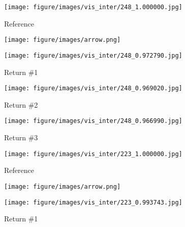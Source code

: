 \captionsetup[subfigure]{labelformat=empty}
\begin{figure*}[t]
\centering
  \begin{subfigure}[b]{.095\linewidth}
    \centering
    \caption{Reference}
    \vspace{-2mm}
    \texttt{[image: figure/images/vis\_inter/248\_1.000000.jpg]}
  \end{subfigure}\hspace{-1mm}
  \begin{subfigure}[b]{0.095\linewidth}
    \centering
    \texttt{[image: figure/images/arrow.png]}
  \end{subfigure} \hspace{-2mm} 
  \begin{subfigure}[b]{.095\linewidth}
    \centering
    \caption{Return \#1}
    \vspace{-2mm}
    \texttt{[image: figure/images/vis\_inter/248\_0.972790.jpg]}
  \end{subfigure}  
   \begin{subfigure}[b]{.095\linewidth}
    \centering
    \caption{Return \#2}
    \vspace{-2mm}
    \texttt{[image: figure/images/vis\_inter/248\_0.969020.jpg]}
  \end{subfigure} 
  \begin{subfigure}[b]{.095\linewidth}
    \centering
    \caption{Return \#3}
    \vspace{-2mm}
     \texttt{[image: figure/images/vis\_inter/248\_0.966990.jpg]}
  \end{subfigure} \hspace{5mm}
   \begin{subfigure}[b]{.095\linewidth}
    \centering
    \caption{Reference}
    \vspace{-2mm}
    \texttt{[image: figure/images/vis\_inter/223\_1.000000.jpg]}
  \end{subfigure}\hspace{-1mm} 
  \begin{subfigure}[b]{0.095\linewidth}
    \centering
    \texttt{[image: figure/images/arrow.png]}
  \end{subfigure}  \hspace{-2mm} 
\begin{subfigure}[b]{.095\linewidth}
    \centering
    \caption{Return \#1}
    \vspace{-2mm}
    \texttt{[image: figure/images/vis\_inter/223\_0.993743.jpg]}

\end{subfigure}
\end{figure*}

